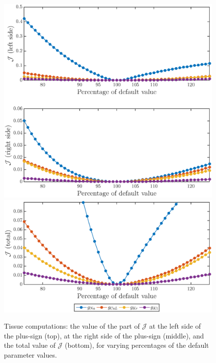 \documentclass[12pt,a4paper]{article}
\begin{document}
\begin{figure}
\includegraphics[trim=0cm 0cm 0cm 1cm, clip=true, width=1\linewidth]{functional_values} 
\includegraphics[trim=0cm 1cm 0cm 1cm, clip=true, width=1\linewidth]{functional_values2} 
    \caption{Tissue computations: the value of the part of $\mathcal{J}$ at the left side of the plus-sign (top), at the right side of the plus-sign (middle), and the total value of $\mathcal{J}$ (bottom), for varying percentages of the default parameter values.}
    \label{fig:9}
\end{figure}
%
\end{document}
